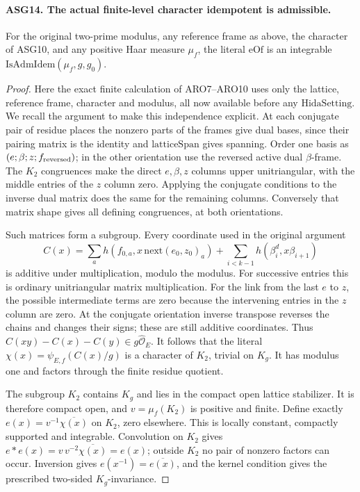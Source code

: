\documentclass[11pt,a4paper]{article}
\numberwithin{equation}{section}
\theoremstyle{remark}\newtheorem{remark}[theorem]{Remark}
\begin{document}
\paragraph{ASG14. The actual finite-level character idempotent is admissible.}
\label{claim:ASG14}
For the original two-prime modulus, any reference frame as above, the
character of ASG10, and any positive Haar measure \(\mu_f\), the
literal \(\mathrm{eOf}\) is an integrable
\(\mathrm{IsAdmIdem}(\mu_f,g,g_0)\).
\begin{proof}
Here the exact finite calculation of ARO7--ARO10 uses only the lattice,
reference frame, character and modulus, all now available before any
\(\mathrm{HidaSetting}\).  We recall the argument to make this
independence explicit.  At each conjugate pair of residue places the
nonzero parts of the frames give dual bases, since their pairing matrix
is the identity and \(\mathrm{latticeSpan}\) gives spanning.
Order one basis as \((e;\beta;z;f_{\rm reversed})\); in the
other orientation use the reversed active dual \(\beta\)-frame.
The \(K_2\) congruences make the direct \(e,\beta,z\) columns
upper unitriangular, with the middle entries of the \(z\) column
zero.  Applying the conjugate conditions to the inverse dual matrix
does the same for the remaining columns.  Conversely that matrix
shape gives all defining congruences, at both orientations.

Such matrices form a subgroup.  Every coordinate used in the original
argument
\[
 C(x)=\sum_a h(f_{0,a},x\,\mathrm{next}(e_0,z_0)_a)
                    +\sum_{i<k-1}h(\beta_i^d,x\beta_{i+1})
\tag{ASG.12}
\]
is additive under multiplication, modulo the modulus.  For successive
entries this is ordinary unitriangular matrix multiplication.  For the
link from the last \(e\) to \(z\), the possible intermediate
terms are zero because the intervening entries in the \(z\) column
are zero.  At the conjugate orientation inverse transpose reverses the
chains and changes their signs; these are still additive coordinates.
Thus \(C(xy)-C(x)-C(y)\in g\widehat{\mathcal O}_E\).
It follows that the literal \(\chi(x)=\psi_{E,f}(C(x)/g)\)
is a character of \(K_2\), trivial on \(K_g\).
It has modulus one and factors through the finite residue quotient.

The subgroup \(K_2\) contains \(K_g\) and lies in the compact
open lattice stabilizer.  It is therefore compact open, and
\(v=\mu_f(K_2)\) is positive and finite.  Define exactly
\(e(x)=v^{-1}\overline{\chi(x)}\) on \(K_2\), zero elsewhere.
This is locally constant, compactly supported and integrable.
Convolution on \(K_2\) gives
\(e*e(x)=v\,v^{-2}\overline{\chi(x)}=e(x)\);
outside \(K_2\) no pair of nonzero factors can occur.
Inversion gives \(e(x^{-1})=\overline{e(x)}\), and the kernel
condition gives the prescribed two-sided \(K_g\)-invariance.


\end{proof}
\end{document}
